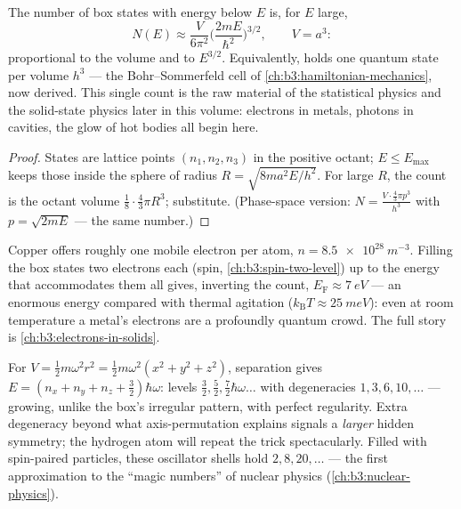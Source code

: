 \begin{proposition}\label{prop:b3:schrodinger-three-dimensions:counting}
The number of box states with energy below $E$ is, for $E$ large,
\[
N(E) \approx \frac{V}{6\pi^2}\Big(\frac{2mE}{\hbar^2}\Big)^{3/2} ,
\qquad V = a^3 :
\]
proportional to the volume and to $E^{3/2}$. Equivalently,  holds one quantum state per volume $h^3$ --- the
Bohr--Sommerfeld cell of
\cref{ch:b3:hamiltonian-mechanics}, now derived. This single count
is the raw material of the statistical physics and the solid-state
physics later in this volume: electrons in metals, photons in
cavities, the glow of hot bodies all begin here.
\end{proposition}

\begin{proof}
States are lattice points $(n_1, n_2, n_3)$ in the positive octant;
$E \le E_{\max}$ keeps those inside the sphere of radius $R =
\sqrt{8ma^2E/h^2}$. For large $R$, the count is the octant volume
$\tfrac18\cdot\tfrac43\pi R^3$; substitute. (Phase-space version:
$N = \tfrac{V\cdot\frac43\pi p^3}{h^3}$ with $p = \sqrt{2mE}$ ---
the same number.)
\end{proof}

\begin{example}\label{ex:b3:schrodinger-three-dimensions:metal}
Copper offers roughly one mobile electron per atom, $n =
\qty{8.5e28}{m^{-3}}$. Filling the box states two electrons each
(spin, \cref{ch:b3:spin-two-level}) up to the energy that
accommodates them all gives, inverting the count, $E_{\text{F}}
\approx \qty{7}{eV}$ --- an enormous energy compared with thermal
agitation ($k_{\text{B}}T \approx \qty{25}{meV}$): even at room
temperature a metal's electrons are a profoundly quantum crowd. The
full story is \cref{ch:b3:electrons-in-solids}.
\end{example}

\begin{example}\label{ex:b3:schrodinger-three-dimensions:oscillator}
For $V = \tfrac12 m\omega^2r^2 = \tfrac12 m\omega^2(x^2 + y^2 +
z^2)$, separation gives $E = (n_x + n_y + n_z + \tfrac32)\hbar\omega$:
levels $\tfrac32, \tfrac52, \tfrac72\hbar\omega\ldots$ with
degeneracies $1, 3, 6, 10, \dots$ --- growing, unlike the box's
irregular pattern, with perfect regularity. Extra degeneracy beyond
what axis-permutation explains signals a \emph{larger} hidden
symmetry; the hydrogen atom will repeat the trick spectacularly.
Filled with spin-paired particles, these oscillator shells hold $2,
8, 20, \dots$ --- the first approximation to the ``magic numbers'' of
nuclear physics (\cref{ch:b3:nuclear-physics}).
\end{example}

